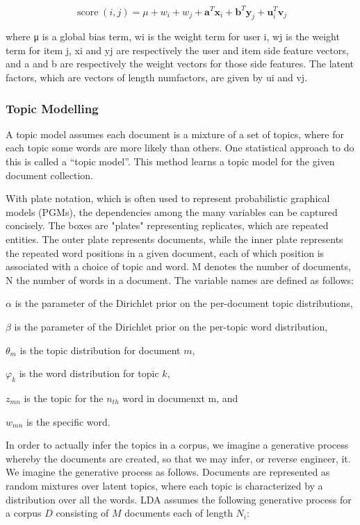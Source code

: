 \[
  \operatorname{score}(i, j) = \mu + w_i + w_j + \mathbf{a}^T \mathbf{x}_i + \mathbf{b}^T \mathbf{y}_j + {\mathbf u}_i^T {\mathbf v}_j
  \]

where μ is a global bias term, wi is the weight term for user i, wj is the weight term for item j, xi and yj are respectively the user and item side feature vectors, and a and b are respectively the weight vectors for those side features. The latent factors, which are vectors of length numfactors, are given by ui and vj.

\subsubsection{Topic Modelling}

A topic model assumes each document is a mixture of a set of topics, where for each topic some words are more likely than others. One statistical approach to do this is called a “topic model”. This method learns a topic model for the given document collection.

With plate notation, which is often used to represent probabilistic graphical models (PGMs), the dependencies among the many variables can be captured concisely. The boxes are "plates" representing replicates, which are repeated entities. The outer plate represents documents, while the inner plate represents the repeated word positions in a given document, each of which position is associated with a choice of topic and word. M denotes the number of documents, N the number of words in a document. The variable names are defined as follows:

$\alpha$ is the parameter of the Dirichlet prior on the per-document topic distributions,

$\beta$ is the parameter of the Dirichlet prior on the per-topic word distribution,

$\theta_{m}$ is the topic distribution for document $m$,

$\varphi_{k}$ is the word distribution for topic $k$,

$z_{mn}$ is the topic for the $n_{th}$ word in documenxt m, and 

$w_{mn}$ is the specific word.


In order to actually infer the topics in a corpus, we imagine a generative process whereby the documents are created, so that we may infer, or reverse engineer, it. We imagine the generative process as follows. Documents are represented as random mixtures over latent topics, where each topic is characterized by a distribution over all the words. LDA assumes the following generative process for a corpus $D$ consisting of $M$ documents each of length $N_{i}$:

